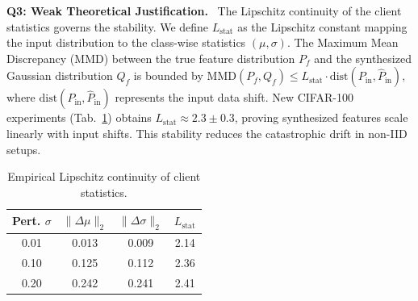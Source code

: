 \documentclass[10pt,twocolumn,letterpaper]{article}
\begin{document}
\noindent\textbf{Q3: Weak Theoretical Justification.}~ The Lipschitz continuity of the client statistics governs the stability. We define $L_{\text{stat}}$ as the Lipschitz constant mapping the input distribution to the class-wise statistics $(\mu, \sigma)$. The Maximum Mean Discrepancy (MMD) between the true feature distribution $P_f$ and the synthesized Gaussian distribution $Q_f$ is bounded by
$
\mathrm{MMD}(P_f, Q_f) \leq L_{\text{stat}} \cdot \mathrm{dist}(P_{\text{in}}, \hat{P}_{\text{in}}),
$
where $\mathrm{dist}(P_{\text{in}}, \hat{P}_{\text{in}})$ represents the input data shift. 
New CIFAR-100 experiments (Tab.~\ref{tab:lipschitz}) obtains $L_{\text{stat}} \approx 2.3\pm 0.3$, proving synthesized features scale linearly with input shifts. This stability reduces the catastrophic drift in non-IID setups. 
\begin{table}[ht]
\vspace{-20pt}
\centering
\caption{Empirical Lipschitz continuity of client statistics.}
\label{tab:lipschitz}
\small
\begin{tabular}{cccc}
\toprule
\textbf{Pert. $\sigma$} & $\|\Delta\mu\|_2$ & $\|\Delta\sigma\|_2$ & $L_{\text{stat}}$ \\
\midrule
0.01 & 0.013 & 0.009 & 2.14 \\
0.10 & 0.125 & 0.112 & 2.36 \\
0.20 & 0.242 & 0.241 & 2.41 \\
\bottomrule
\end{tabular}
\vspace{-10pt}
\end{table}
\end{document}
